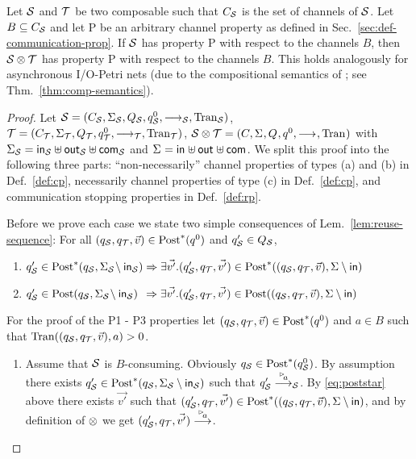 \begin{proposition}\label{prop:cp:compos}
   Let $\S$ and $\T$ be two composable \AIOTSs such that $\chan_\S$ is the set of channels of $\S$. Let $B \subseteq \chan_\S$ and let P be an arbitrary channel property as defined in Sec.~\ref{sec:def-communication-prop}.
   If $\S$ has property P with respect to the channels $B$, then $\S \compos \T$ has property P with respect to the channels $B$.
This holds analogously for asynchronous I/O-Petri nets (due to the compositional semantics of \AIOPNs; see Thm.~\ref{thm:comp-semantics}).
\end{proposition}
\begin{proof}
	Let $\S = \aiotstup{\S}$, $\T = \aiotstup{\T}$, $\S\compos\T = \aiotstup{}$ with $\ioalpha{\S}$ and $\ioalpha{}$.
    We split this proof into the following three parts: ``non-necessarily'' channel properties of types (a) and (b) in Def.~\ref{def:cp}, necessarily channel properties of type (c)  in Def.~\ref{def:cp}, and communication stopping properties in Def.~\ref{def:rp}.

    \smallskip{}
    Before we prove each case we state two simple consequences of Lem.~\ref{lem:reuse-sequence}:
    For all $(q_\S,q_\T,\vec{v}) \in \post^*(q^0)$ and $q'_\S \in Q_\S$, 
    \begin{enumerate}[label=(\arabic*), ref=(\arabic*), leftmargin=*]
        \item\label{eq:poststar} 
        $q'_\S \in \post^*(q_\S,\Sigma_\S\!\setminus\inset_\S) \Rightarrow \exists \vec{v'}.(q'_\S,q_\T,\vec{v'}) \in \post^*((q_\S,q_\T,\vec{v}),\Sigma \setminus \inset)$
        \item\label{eq:post}$q'_\S \in \post(q_\S,\Sigma_\S\!\setminus\inset_\S) \;\,\Rightarrow \exists \vec{v'}.(q'_\S,q_\T,\vec{v'}) \in \post((q_\S,q_\T,\vec{v}),\Sigma \setminus \inset)$
    \end{enumerate}

For the proof of the P1 - P3 properties let $(q_\S,q_\T,\vec{v}) \in \post^*(q^0)$ and $a \in B$ such that $\val((q_\S,q_\T,\vec{v}),a) > 0$. 
    \begin{enumerate} [label=P1.\alph*:,leftmargin=2.7em]       
        \item Assume that $\S$ is $B$-consuming. 
        Obviously $q_\S \in \post^*(q^0_\S)$. By assumption there exists $q'_\S \in \post^*(q_\S,\Sigma_\S \setminus \inset_{\S})$ such that $q'_\S \goes{\inact{a}}_\S$. By \ref{eq:poststar} above  there exists $\vec{v'}$ such that $(q'_\S,q_\T,\vec{v'}) \in \post^*((q_\S,q_\T,\vec{v}),\Sigma \setminus \inset)$, and by definition of $\compos$ we get $(q'_\S,q_\T,\vec{v'})\goes{\inact{a}}$. 


\end{enumerate}
\end{proof}
